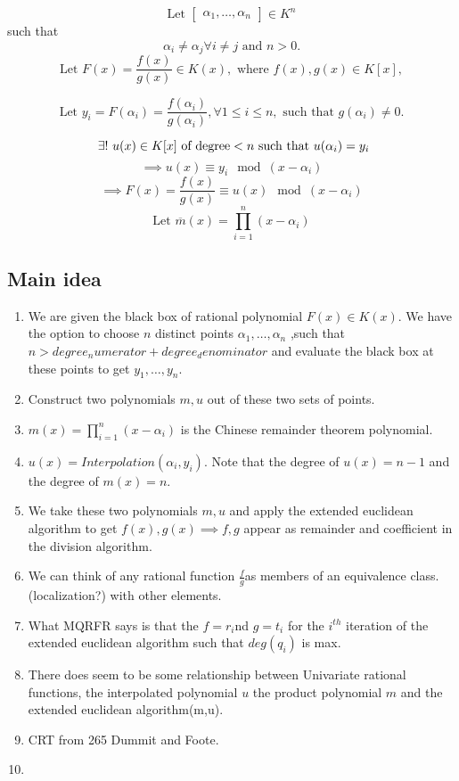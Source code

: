 \[
\text{Let } \begin{bmatrix}
    \alpha_{1}, \dots,\alpha_{n} 
\end{bmatrix}\in K^n
\] such that 
\[
\alpha_{i}\neq\alpha_{j} \forall i\neq j\text{ and }n >0.
\]
\[
\text{Let } F(x)=\frac{f(x)}{g(x)} \in K(x), \text{ where }f(x),g(x) \in K[x],\]

\[
\text{Let } y_{i}=F(\alpha_{i})=\frac{f(\alpha_{i})}{g(\alpha_{i})}, \forall 1 \leq i 
\leq n, \text{ such that } g(\alpha_{i})\neq 0.
\]

\[\
\exists! \text{ } u(x) \in K[x] \text{ of degree} < n \text { such that } 
u(\alpha_{i})=y_{i}
\]
\[
\implies u(x) \equiv y_{i} \mod (x-\alpha_{i})
\]
\[
\implies F(x)=\frac{f(x)}{g(x)} \equiv u(x) \mod(x-\alpha_{i})
\]
\[
\text{Let } \overline{m}(x)=\prod_{i=1}^{n}(x- \alpha_{i})
\]
\subsection{Main idea}

\begin{enumerate}
    \item We are given the black box of rational polynomial $F(x) \in K(x)$.
    We have the option to choose $n$ distinct points $\alpha_{1},\dots,\alpha_{n}$
    ,such that $n > degree_numerator+ degree_denominator$ 
    and evaluate the black box at these points to get $y_{1},\dots,y_{n}$.
    \item Construct two polynomials $m,u$ out of these two sets of points.
    \item $m(x)=\prod_{i=1}^{n}(x-\alpha_{i})$ is the Chinese remainder theorem 
    polynomial.
    \item $u(x)= Interpolation(\alpha_{i},y_{i})$. Note that the degree of
     $u(x)=n-1$ and the degree of $m(x)=n$.
     \item We take these two polynomials $m,u$ and apply the extended euclidean 
      algorithm to get $f(x),g(x) \implies f,g$ appear as remainder and 
      coefficient in the division algorithm.
      \item We can think of any rational function $\frac{f}{g} $as members of an equivalence 
      class.(localization?) with other elements. 
      \item What MQRFR says is that the $f=r_{i}$nd $g=t_{i}$ for the $i^{th}$
      iteration of the extended euclidean algorithm  such that
    $deg (q_{i})$ is max. 
    \item There does seem to be some relationship between Univariate rational
    functions, the interpolated polynomial $u$
    the product polynomial $m$ and the extended euclidean algorithm(m,u).  
      

      \item CRT from 265 Dummit and Foote.     
      \item                
\end{enumerate}

